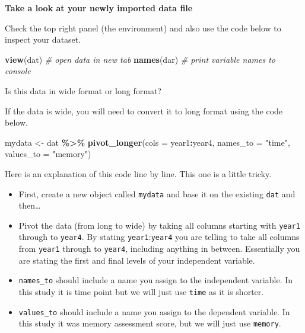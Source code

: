 \documentclass[
]{book}
\newenvironment{Shaded}{\begin{snugshade}}{\end{snugshade}}
\newcommand{\AttributeTok}[1]{\textcolor[rgb]{0.13,0.29,0.53}{#1}}
\newcommand{\CommentTok}[1]{\textcolor[rgb]{0.56,0.35,0.01}{\textit{#1}}}
\newcommand{\FunctionTok}[1]{\textcolor[rgb]{0.13,0.29,0.53}{\textbf{#1}}}
\newcommand{\NormalTok}[1]{#1}
\newcommand{\OtherTok}[1]{\textcolor[rgb]{0.56,0.35,0.01}{#1}}
\newcommand{\SpecialCharTok}[1]{\textcolor[rgb]{0.81,0.36,0.00}{\textbf{#1}}}
\newcommand{\StringTok}[1]{\textcolor[rgb]{0.31,0.60,0.02}{#1}}
\begin{document}
\textbf{Take a look at your newly imported data file}

Check the top right panel (the environment) and also use the code below to inspect your dataset.

\begin{Shaded}
\begin{Highlighting}[]
\FunctionTok{view}\NormalTok{(dat) }\CommentTok{\# open data in new tab}
\FunctionTok{names}\NormalTok{(dar) }\CommentTok{\# print variable names to console}
\end{Highlighting}
\end{Shaded}

Is this data in wide format or long format?

If the data is wide, you will need to convert it to long format using the code below.

\begin{Shaded}
\begin{Highlighting}[]
\NormalTok{mydata }\OtherTok{\textless{}{-}}\NormalTok{ dat }\SpecialCharTok{\%\textgreater{}\%}
  \FunctionTok{pivot\_longer}\NormalTok{(}\AttributeTok{cols =}\NormalTok{ year1}\SpecialCharTok{:}\NormalTok{year4,}
               \AttributeTok{names\_to =} \StringTok{"time"}\NormalTok{,}
               \AttributeTok{values\_to =} \StringTok{"memory"}\NormalTok{)}
\end{Highlighting}
\end{Shaded}

Here is an explanation of this code line by line. This one is a little tricky.

\begin{itemize}
\item
  First, create a new object called \texttt{mydata} and base it on the existing \texttt{dat} and then\ldots{}
\item
  Pivot the data (from long to wide) by taking all columns starting with \texttt{year1} through to \texttt{year4}. By stating \texttt{year1}:\texttt{year4} you are telling to take all columns from \texttt{year1} through to \texttt{year4}, including anything in between. Essentially you are stating the first and final levels of your independent variable.
\item
  \texttt{names\_to} should include a name you assign to the independent variable. In this study it is time point but we will just use \texttt{time} as it is shorter.
\item
  \texttt{values\_to} should include a name you assign to the dependent variable. In this study it was memory assessment score, but we will just use \texttt{memory}.
\end{itemize}
\end{document}
